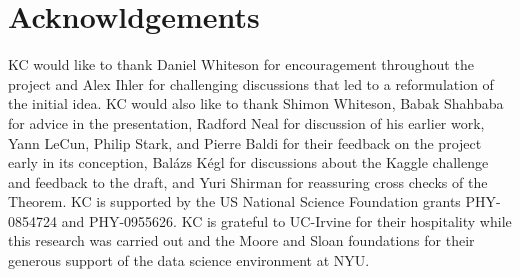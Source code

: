\documentclass[aoas,preprint]{imsart}
\numberwithin{equation}{section}
\theoremstyle{plain}
\begin{document}
%
%
%
%
%
%



\section*{Acknowldgements}
KC would like to thank  
Daniel Whiteson for encouragement throughout the project and
Alex Ihler for challenging discussions that 
led to a reformulation of the initial idea. KC would also like to thank Shimon Whiteson, Babak Shahbaba for advice in the presentation, Radford Neal for discussion of his earlier work, Yann LeCun, Philip Stark, and Pierre Baldi for their feedback on the
project early in its conception, Bal\'azs K\'egl for discussions about the Kaggle challenge and feedback to the draft, 
and Yuri Shirman for reassuring cross checks of the Theorem. 
KC is supported by the US National Science Foundation grants PHY-0854724 and PHY-0955626. 
KC is grateful to UC-Irvine for their hospitality while this research was carried out and the 
Moore and Sloan foundations for their generous support of the data science environment at NYU.

\newpage

%


\end{document}

